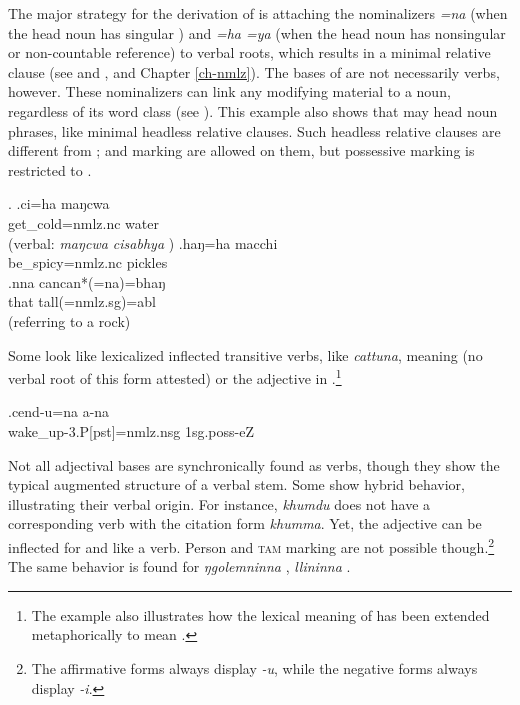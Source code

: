 The major strategy for the derivation of  is attaching the nominalizers \emph{=na} (when the head noun has singular ) and \emph{=ha \ti =ya} (when the head noun has nonsingular  or non-countable reference) to verbal roots, which results in a minimal relative clause (see \Next[a] and \Next[b], and Chapter \ref{ch-nmlz}). The bases of  are not necessarily verbs, however. These nominalizers can link any modifying material to a noun, regardless of its word class (see \Next[c]). This example also shows that  may head noun phrases, like minimal headless relative clauses. Such headless relative clauses are different from ;  and  marking are allowed on them, but possessive marking is restricted to . 

\ex. \ag.ci=ha maŋcwa\\
get\_cold{\sc =nmlz.nc} water\\
 (verbal: \emph{maŋcwa cisabhya} )
	\bg.haŋ=ha macchi\\
	be\_spicy{\sc =nmlz.nc} pickles\\
 	\bg.nna cancan*(=na)=bhaŋ\\
		that tall{\sc *(=nmlz.sg)=abl}\\
	  (referring to a rock)
	
Some  look like  lexicalized inflected transitive verbs, like \emph{cattuna}, meaning   (no verbal root of this form attested) or the adjective in \Next.\footnote{The example also illustrates how the lexical meaning of  has been extended metaphorically to mean .} 
	
	\exg.cend-u=na a-na \\
  wake\_up{\sc -3.P[pst]=nmlz.nsg} {\sc 1sg.poss-}eZ\\
   
  

Not all adjectival bases are synchronically found as verbs, though they show the typical augmented structure of a verbal stem. Some  show hybrid behavior, illustrating their verbal origin. For ins\-tance, \emph{khumdu}  does not have a corresponding verb with the cita\-tion form \emph{khumma}. Yet, the adjective can be inflected for  and  like a verb. Person and \textsc{tam} marking are not possible though.\footnote{The affirmative forms always display \emph{-u}, while the negative forms always display \emph{-i}.} The same behavior is found for \emph{ŋgolemninna} ,  \emph{llininna} .

